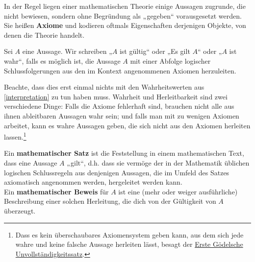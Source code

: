 \begin{de}[Axiom]
 In der Regel liegen einer mathematischen Theorie einige Aussagen zugrunde, die nicht bewiesen, sondern ohne Begründung als „gegeben“ vorausgesetzt werden. Sie heißen \textbf{Axiome} und kodieren oftmals Eigenschaften derjenigen Objekte, von denen die Theorie handelt.
\end{de}





\begin{de} \label{esgilt}
 Sei $A$ eine Aussage. Wir schreiben „$A$ ist gültig“ oder „Es gilt $A$“ oder „$A$ ist wahr“, falls es möglich ist, die Aussage $A$ mit einer Abfolge logischer Schlussfolgerungen aus den im Kontext angenommenen Axiomen herzuleiten.
 \end{de}
 
 
 \begin{bem}
 Beachte, dass dies erst einmal nichts mit den Wahrheitswerten aus \cref{interpretation} zu tun haben muss. Wahrheit und Herleitbarkeit sind zwei verschiedene Dinge: Falls die Axiome fehlerhaft sind, brauchen nicht alle aus ihnen ableitbaren Aussagen wahr sein; und falls man mit zu wenigen Axiomen arbeitet, kann es wahre Aussagen geben, die sich nicht aus den Axiomen herleiten lassen.\footnote{Dass es kein überschaubares Axiomensystem geben kann, aus dem sich jede wahre und keine falsche Aussage herleiten lässt, besagt der \href{https://de.wikipedia.org/wiki/G\%C3\%B6delscher_Unvollst\%C3\%A4ndigkeitssatz\#Erster_Unvollst\%C3\%A4ndigkeitssatz}{Erste Gödelsche Unvollständigkeitssatz}.}
\end{bem}



\begin{de}
 Ein \textbf{mathematischer Satz} ist die Feststellung in einem mathematischen Text, dass eine Aussage $A$ „gilt“, d.h. dass sie vermöge der in der Mathematik üblichen logischen Schlussregeln aus denjenigen Aussagen, die im Umfeld des Satzes axiomatisch angenommen werden, hergeleitet werden kann. \\[0.5em]
 Ein \textbf{mathematischer Beweis} für $A$ ist eine (mehr oder weiger ausführliche) Beschreibung einer solchen Herleitung, die dich von der Gültigkeit von $A$ überzeugt.
\end{de}




